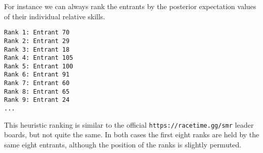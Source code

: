 \documentclass[
  letterpaper,
  DIV=11,
  numbers=noendperiod]{scrartcl}
\newenvironment{Shaded}{\begin{snugshade}}{\end{snugshade}}
\newcommand{\AttributeTok}[1]{\textcolor[rgb]{0.40,0.45,0.13}{#1}}
\newcommand{\ConstantTok}[1]{\textcolor[rgb]{0.56,0.35,0.01}{#1}}
\newcommand{\ControlFlowTok}[1]{\textcolor[rgb]{0.00,0.23,0.31}{#1}}
\newcommand{\DecValTok}[1]{\textcolor[rgb]{0.68,0.00,0.00}{#1}}
\newcommand{\FunctionTok}[1]{\textcolor[rgb]{0.28,0.35,0.67}{#1}}
\newcommand{\NormalTok}[1]{\textcolor[rgb]{0.00,0.23,0.31}{#1}}
\newcommand{\OtherTok}[1]{\textcolor[rgb]{0.00,0.23,0.31}{#1}}
\newcommand{\SpecialCharTok}[1]{\textcolor[rgb]{0.37,0.37,0.37}{#1}}
\newcommand{\StringTok}[1]{\textcolor[rgb]{0.13,0.47,0.30}{#1}}
\begin{document}
For instance we can always rank the entrants by the posterior
expectation values of their individual relative skills.

\begin{Shaded}
\end{Shaded}

\begin{verbatim}
Rank 1: Entrant 70
Rank 2: Entrant 29
Rank 3: Entrant 18
Rank 4: Entrant 105
Rank 5: Entrant 100
Rank 6: Entrant 91
Rank 7: Entrant 60
Rank 8: Entrant 65
Rank 9: Entrant 24
...
\end{verbatim}

This heuristic ranking is similar to the official
\texttt{https://racetime.gg/smr} leader boards, but not quite the same.
In both cases the first eight ranks are held by the same eight entrants,
although the position of the ranks is slightly permuted.
\end{document}
